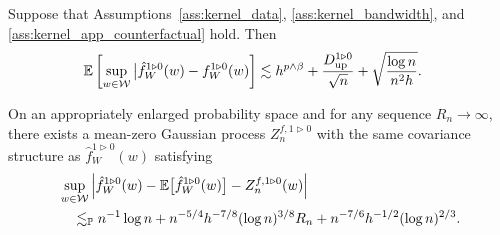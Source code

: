 \begin{lemma}
  \label{lem:kernel_app_counterfactual_uniform_consistency}

  Suppose that Assumptions~\ref{ass:kernel_data},
  \ref{ass:kernel_bandwidth}, and \ref{ass:kernel_app_counterfactual} hold.
  Then
  \begin{align*}
    \mathbb{E}\left[
      \sup_{w \in \mathcal{W}}
      \big|\hat f_W^{1 \triangleright 0}(w)
      - f_W^{1 \triangleright 0}(w)
    \right]
    &\lesssim
    h^{p \wedge \beta}
    + \frac{D_{\textup{up}}^{1 \triangleright 0}}{\sqrt n}
    + \sqrt{\frac{\log n}{n^2h}}.
  \end{align*}

\end{lemma}

\begin{lemma}
  \label{lem:kernel_app_counterfactual_sa}

  On an appropriately enlarged probability space
  and for any sequence $R_n \to \infty$,
  there exists a mean-zero Gaussian process
  $Z_n^{f, 1 \triangleright 0}$
  with the same covariance structure as
  $\hat f_W^{1 \triangleright 0}(w)$ satisfying
  \begin{align*}
    &\sup_{w \in \mathcal{W}}
    \left|
    \hat f_W^{1 \triangleright 0}(w)
    - \mathbb{E}\big[\hat f_W^{1 \triangleright 0}(w)\big]
    - Z_n^{f, 1 \triangleright 0}(w)
    \right| \\
    &\quad\lesssim_{\mathbb{P}}
    n^{-1} \log n
    + n^{-5/4} h^{-7/8} (\log n)^{3/8} R_n
    + n^{-7/6} h^{-1/2} (\log n)^{2/3}.
  \end{align*}

\end{lemma}

